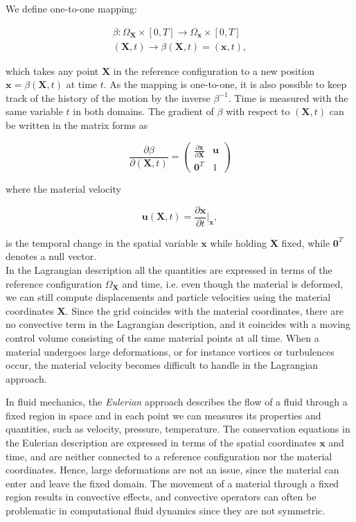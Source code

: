 \documentclass[a4paper,11pt,openright,twoside]{book}
\begin{document}
We define one-to-one mapping:

\begin{align*}
\beta : \Omega_{\mathbf{X}} \times [0, T]  \rightarrow \Omega_\mathbf{x} \times [0, T] \\
(\mathbf{X} , t)  \rightarrow \beta(\mathbf{X}, t) = (\mathbf{x}, t),
\end{align*}

which takes any point $\mathbf{X}$ in the reference configuration to a new position $\mathbf{x} = \beta(\mathbf{X},t)$ at time $t$. As the mapping is one-to-one, it is also possible to keep track of the history of the motion by the inverse $\beta^{-1}$. Time is measured with the same variable $t$ in both domains. The gradient of $\beta$ with respect to $(\mathbf{X},t)$ can be written in the matrix forms as

\begin{equation}
\frac{\partial \beta}{\partial(\mathbf{X}, t)} = 
\begin{pmatrix}
\frac{\partial \mathbf{x}}{\partial \mathbf{X}} & \mathbf{u} \\
\mathbf{0}^T & 1
\end{pmatrix}
\end{equation}

where the material velocity

\begin{equation}
\mathbf{u}(\mathbf{X}, t) = \frac{\partial \mathbf{x}}{\partial t} {\Big |}_\mathbf{x},
\end{equation}

is the temporal change in the spatial variable $\mathbf{x}$ while holding $\mathbf{X}$ fixed, while $\mathbf{0}^T$ denotes a null vector. \\
In the Lagrangian description all the quantities are expressed in terms of the reference configuration $\Omega_{\mathbf{X}}$ and time, i.e. even though the material is deformed, we can still compute displacements and particle velocities using the material coordinates $\mathbf{X}$.
Since the grid coincides with the material coordinates, there are no convective term in the Lagrangian description, and it coincides with a moving control volume consisting of the same material points at all time. When a material undergoes large deformations, or for instance vortices or turbulences occur, the material velocity becomes difficult to handle in the Lagrangian approach.

In fluid mechanics, the \emph{Eulerian} approach describes the flow of a fluid through a fixed region in space and in each point we can measures its properties and quantities, such as velocity, pressure, temperature. The conservation equations in the Eulerian description are expressed in terms of the spatial coordinates $\mathbf{x}$ and time, and are neither connected to a reference configuration nor the material coordinates. Hence, large deformations are not an issue, since the material can enter and leave the fixed domain. The movement of a material through a fixed region results in convective effects, and convective operators can often be problematic in computational fluid dynamics since they are not symmetric.
\end{document}
